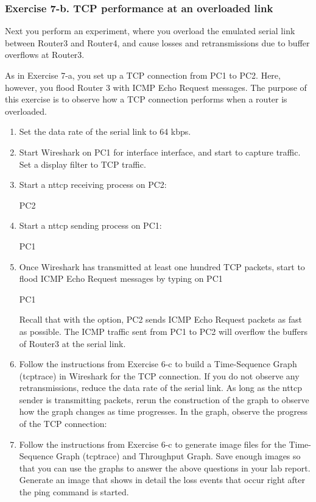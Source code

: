 \begin{questions}
\end{questions}


\subsubsection{Exercise 7-b. TCP performance at an overloaded link}

Next you perform an experiment, where you overload the emulated serial link between Router3 and Router4, and cause losses and retransmissions due to buffer overflows at Router3.

As in Exercise 7-a, you set up a TCP connection from PC1 to PC2. Here, however, you flood Router 3 with ICMP Echo Request messages. The purpose of this exercise is to observe how a TCP connection performs when a router is overloaded.
\begin{enumerate}
	\item Set the data rate of the serial link to 64 kbps. 
	\item Start Wireshark on PC1 for interface  interface, and start to capture traffic. Set a display filter to TCP traffic.
	\item Start a nttcp receiving process on PC2:
		\begin{cmdblock}
	PC2%
		\end{cmdblock}
	\item Start a nttcp sending process on PC1:
		\begin{cmdblock}
	PC1%
		\end{cmdblock}
	\item Once Wireshark has transmitted at least one hundred TCP packets, start to flood ICMP Echo Request messages by typing on PC1
		\begin{cmdblock}
	PC1%
		\end{cmdblock}
		Recall that with the  option, PC2 sends ICMP Echo Request packets as fast as possible. The ICMP traffic sent from PC1 to PC2 will overflow the buffers of Router3 at the serial link.
	\item Follow the instructions from Exercise 6-c to build a Time-Sequence Graph (tcptrace) in Wireshark for the TCP connection. If you do not observe any retransmissions, reduce the data rate of the serial link. As long as the nttcp sender is transmitting packets, rerun the construction of the graph to observe how the graph changes as time progresses. In the graph, observe the progress of the TCP connection:
	\item Follow the instructions from Exercise 6-c to generate image files for the Time- Sequence Graph (tcptrace) and Throughput Graph. Save enough images so that you can use the graphs to answer the above questions in your lab report. Generate an image that shows in detail the loss events that occur right after the ping command is started.
\end{enumerate}


